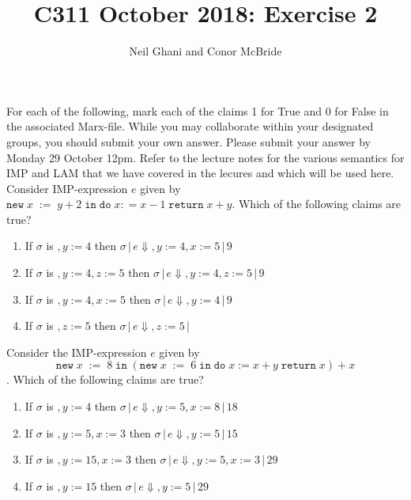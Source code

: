 \documentclass{article}
\begin{document}
\title{C311 October 2018: Exercise 2}
\author{Neil Ghani and Conor McBride}
\maketitle

\newcommand{\newe}[3]{\mathtt{new}\;#1\;\mathtt{:=}\;#2\;\mathtt{in}\;#3}
\newcommand{\newc}[3]{\mathtt{new}\;#1\;\mathtt{:=}\;#2\;\mathtt{in}\;#3}
\newcommand{\doe}[2]{\mathtt{do}\;#1\;\mathtt{return}\;#2}
\newcommand{\doret}[2]{\mathtt{do}\;#1\;\mathtt{return}\;#2}
\newcommand{\ifel}[3]{\mathtt{if}\;\mathtt{(}#1\mathtt{)}\;#2\;\mathtt{else}\;#3}
\newcommand{\whi}[2]{\mathtt{while}\; \mathtt{(}#1\mathtt{)} \;#2}
\newcommand{\ang}[1]{\langle #1 \rangle}
\newcommand{\NT}[1]{\ang{\mathit{#1}}}
\newcommand{\wk}[2]{#1 \backslash #2}
\newcommand{\evalJ}[4]{#1 \,|\, #2 \Downarrow #3 \,|\, #4}
\newcommand{\evalLam}[2]{#1 \Downarrow #2}

For each of the following, mark each of the claims 1 for True
and 0 for False in the associated Marx-file. While you may collaborate
within your designated groups, you should submit your own answer. Please submit your answer
by Monday 29 October 12pm. Refer to the lecture notes for the various
semantics for IMP and LAM that we have covered in the lecures and
which will be used here.\\[1ex]


 Consider IMP-expression $e$ given by $\newe{x}{y + 2}{\doe{x : = x-1}{x + y}}$.
Which of the following claims are true?
\begin{enumerate}
\item If $\sigma$ is $,y := 4$ then $\evalJ{\sigma}{e}{ ,y:= 4, x:=5}{9}$
\item If $\sigma$ is $,y:= 4, z:=5$ then $\evalJ{\sigma}{e}{ ,y:= 4, z:=5}{9}$
\item If $\sigma$ is $,y:= 4, x:=5$ then $\evalJ{\sigma}{e}{ ,y:= 4}{9}$
\item If $\sigma$ is $,z:=5$ then $\evalJ{\sigma}{e}{ ,z:=5}{}$
\end{enumerate}


 Consider the IMP-expression $e$ given by
$$\newe{x}{8}{(\newe{x}{6}{\doe{x := x + y}{x}}) + x}$$. Which of the 
following claims are true?
\begin{enumerate}
\item If $\sigma$ is $,y := 4$ then $\evalJ{\sigma}{e}{,y:=5, x:=8}{18}$
\item If $\sigma$  is $,y := 5, x:=3$ then $\evalJ{\sigma}{e}{,y:=5}{15}$
\item If $\sigma$ is $,y := 15, x:=3$ then $\evalJ{\sigma}{e}{,y:=5,x:=3}{29}$
\item If $\sigma$ is $,y := 15$ then $\evalJ{\sigma}{e}{,y:=5}{29}$
\end{enumerate}
\end{document}
